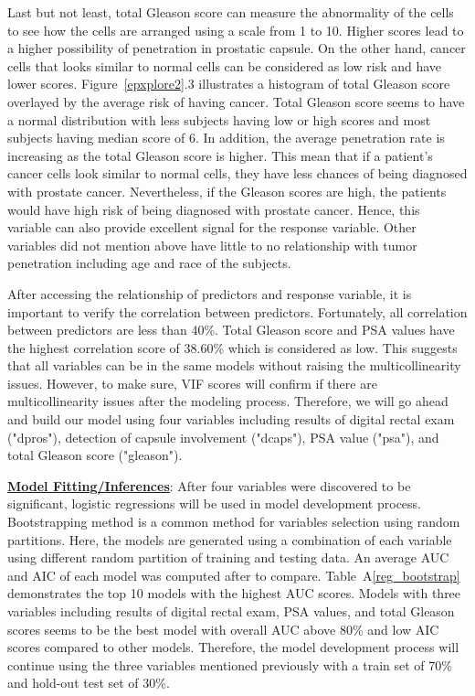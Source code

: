 \documentclass[11pt]{article}\usepackage[]{graphicx}\usepackage[]{color}
\begin{document}
\noindent Last but not least, total Gleason score can measure the abnormality of the cells to see how the cells are arranged using a scale from 1 to 10. Higher scores lead to a higher possibility of penetration in prostatic capsule. On the other hand, cancer cells that looks similar to normal cells can be considered as low risk and have lower scores. Figure~\ref{epxplore2}.3 illustrates a histogram of total Gleason score overlayed by the average risk of having cancer. Total Gleason score seems to have a normal distribution with less subjects having low or high scores and most subjects having median score of 6. In addition, the average penetration rate is increasing as the total Gleason score is higher. This mean that if a patient's cancer cells look similar to normal cells, they have less chances of being diagnosed with prostate cancer. Nevertheless, if the Gleason scores are high, the patients would have high risk of being diagnosed with prostate cancer. Hence, this variable can also provide excellent signal for the response variable. Other variables did not mention above have little to no relationship with tumor penetration including age and race of the subjects.  
\hfill \break

\noindent After accessing the relationship of predictors and response variable, it is important to verify the correlation between predictors. Fortunately, all correlation between predictors are less than 40\%. Total Gleason score and PSA values have the highest correlation score of 38.60\% which is considered as low. This suggests that all variables can be in the same models without raising the multicollinearity issues. However, to make sure, VIF scores will confirm if there are multicollinearity issues after the modeling process. Therefore, we will go ahead and build our model using four variables including results of digital rectal exam ("dpros"), detection of capsule involvement ("dcaps"), PSA value ("psa"), and total Gleason score ("gleason").
\hfill \break

\noindent\textbf{\underline{Model Fitting/Inferences}}: After four variables were discovered to be significant, logistic regressions will be used in model development process. Bootstrapping method is a common method for variables selection using random partitions. Here, the models are generated using a combination of each variable using different random partition of training and testing data. An average AUC and AIC of each model was computed after to compare. Table~A\ref{reg_bootstrap} demonstrates the top 10 models with the highest AUC scores. Models with three variables including results of digital rectal exam, PSA values, and total Gleason scores seems to be the best model with overall AUC above 80\% and low AIC scores compared to other models. Therefore, the model development process will continue using the three variables mentioned previously with a train set of 70\% and hold-out test set of 30\%.
\hfill \break
\end{document}
